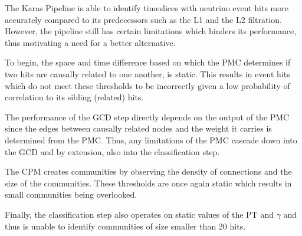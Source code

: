 
The Karas Pipeline is able to identify timeslices with neutrino event
hits more accurately compared to its predecessors such as the L1 and
the L2 filtration. However, the pipeline still has certain limitations
which hinders its performance, thus motivating a need for a better
alternative.

To begin, the space and time difference based on which the PMC
determines if two hits are causally related to one another, is static.
This results in event hits which do not meet these thresholds to be
incorrectly given a low probability of correlation to its sibling
(related) hits.

The performance of the GCD step directly depends on the output of the
PMC since the edges between causally related nodes and the weight it
carries is determined from the PMC. Thus, any limitations of the PMC
cascade down into the GCD and by extension, also into the
classification step.


The CPM creates communities by observing the density of connections
and the size of the communities. These thresholds are once again
static which results in small communities being overlooked.

Finally, the classification step also operates on static values of the
PT and $\gamma$ and thus is unable to identify communities of size
smaller than 20 hits.
